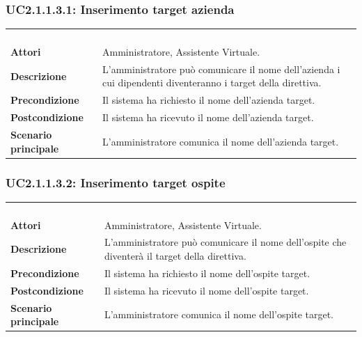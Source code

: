 \subsubsection{UC2.1.1.3.1: Inserimento target azienda}
\label{UC2.1.1.3.1}
\begin{longtable}{l|p{10cm}}
\rowcolor[gray]{0.8} \multicolumn{2}{c}{} \\
\rowcolor[gray]{0.8} \multicolumn{2}{c}{\textbf{UC2.1.1.3.1 - Inserimento target azienda}} \\
\rowcolor[gray]{0.8} \multicolumn{2}{c}{} \\
\hline
&\\
\textbf{Attori} & Amministratore, Assistente Virtuale.\\[7pt]
\textbf{Descrizione} & L'amministratore può comunicare il nome dell'azienda i cui dipendenti diventeranno i target della direttiva.\\[7pt]
\textbf{Precondizione} & Il sistema ha richiesto il nome dell'azienda target.\\[7pt]
\textbf{Postcondizione} & Il sistema ha ricevuto il nome dell'azienda target.\\[7pt]
\textbf{Scenario principale} &L'amministratore comunica il nome dell'azienda target.\\[7pt]\hline
\end{longtable}

\subsubsection{UC2.1.1.3.2: Inserimento target ospite}
\label{UC2.1.1.3.2}
\begin{longtable}{l|p{10cm}}
\rowcolor[gray]{0.8} \multicolumn{2}{c}{} \\
\rowcolor[gray]{0.8} \multicolumn{2}{c}{\textbf{UC2.1.1.3.2 - Inserimento target ospite}} \\
\rowcolor[gray]{0.8} \multicolumn{2}{c}{} \\
\hline
&\\
\textbf{Attori} & Amministratore, Assistente Virtuale.\\[7pt]
\textbf{Descrizione} & L'amministratore può comunicare il nome dell'ospite che diventerà il target della direttiva.\\[7pt]
\textbf{Precondizione} & Il sistema ha richiesto il nome dell'ospite target.\\[7pt]
\textbf{Postcondizione} & Il sistema ha ricevuto il nome dell'ospite target.\\[7pt]
\textbf{Scenario principale} &L'amministratore comunica il nome dell'ospite target.\\[7pt]\hline
\end{longtable}

